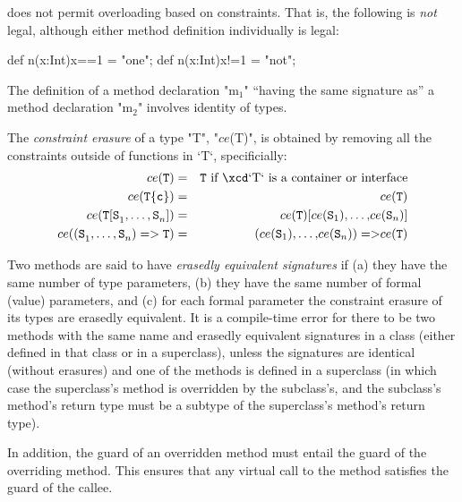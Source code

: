 \XtenCurrVer{} does not permit overloading based on constraints. That is, the
following is {\em not} legal, although either method definition individually
is legal:
\begin{xten}
   def n(x:Int){x==1} = "one";
   def n(x:Int){x!=1} = "not";
\end{xten}




The definition of a method declaration \xcdmath"m$_1$" ``having the same signature
as'' a method declaration \xcdmath"m$_2$" involves identity of types. 



The {\em constraint erasure} of a type \xcdmath"T", 
\xcdmath"$ce$(T)",
is obtained by removing all the constraints outside of functions in \xcd`T`,
specificially: 
\begin{eqnarray}
ce({\tt T}) &=& {\tt T} \mbox{ if \xcd`T` is a container or interface}\\
ce({\tt T\{c\}}) &=& ce({\tt T})\\
ce({\tt T[S}_1{\tt,}\ldots{\tt,S}_n{\tt ]})
  &=&
ce({\tt T}){\tt [} ce({\tt S}_1){\tt,}\ldots{\tt,} ce({\tt S}_n){\tt ]}\\
ce({\tt (S}_1{\tt,}\ldots{\tt,S}_n{\tt ) => T})
  &=&
{\tt }{\tt (} ce({\tt S}_1){\tt,}\ldots{\tt,} ce({\tt S}_n){\tt ) => } 
ce({\tt T})
\end{eqnarray}



 Two methods are said to have {\em erasedly equivalent signatures} if (a) they have the
 same number of type parameters, 
(b) they have the same number of formal (value) parameters, and (c)
for each formal parameter the constraint erasure of its types are erasedly equivalent.
It is a 
compile-time error for there to be two methods with the same name and
erasedly equivalent signatures in a class (either defined in that class or in a
superclass), unless the signatures are identical (without erasures) and one of the methods is
defined in a superclass (in which case the superclass's method is overridden
by the subclass's, and the subclass's method's return type must be a subtype of
the superclass's method's return type).  

 



In addition, the guard of an overridden method
must entail
the guard of the overriding method.   This
ensures that any virtual call to the method
satisfies the guard of the callee.

